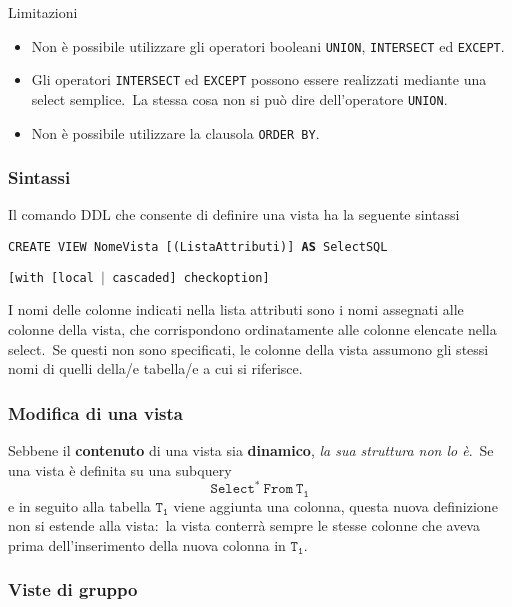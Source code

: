 \noindent Limitazioni

\begin{itemize}
	\item Non è possibile utilizzare gli operatori booleani \texttt{UNION}, \texttt{INTERSECT} ed \texttt{EXCEPT}.
	\item Gli operatori \texttt{INTERSECT} ed \texttt{EXCEPT} possono essere realizzati mediante una select semplice.\ La stessa cosa non si può dire dell'operatore \texttt{UNION}.
	\item Non è possibile utilizzare la clausola \texttt{ORDER BY}.
\end{itemize}

\subsubsection{Sintassi}

Il comando DDL che consente di definire una vista ha la seguente sintassi

\begin{flushleft}
	\texttt{CREATE VIEW NomeVista [(ListaAttributi)] \textbf{AS} SelectSQL}

	\texttt{[with [local $|$ cascaded] checkoption]}
\end{flushleft}

\noindent I nomi delle colonne indicati nella lista attributi sono i nomi assegnati alle colonne della vista, che corrispondono ordinatamente alle colonne elencate nella select.\
Se questi non sono specificati, le colonne della vista assumono gli stessi nomi di quelli della/e tabella/e a cui si riferisce.

\subsubsection{Modifica di una vista}

Sebbene il \textbf{contenuto} di una vista sia \textbf{dinamico}, \textit{la sua struttura non lo è}.\
Se una vista è definita su una subquery
\[\mathtt{Select^*\ From\ T_1}\]
e in seguito alla tabella $\mathtt{T_1}$ viene aggiunta una colonna, questa nuova definizione non si estende alla vista:\ la vista conterrà sempre le stesse colonne che aveva prima dell'inserimento della nuova colonna in $\mathtt{T_1}$.\

\subsubsection{Viste di gruppo}

